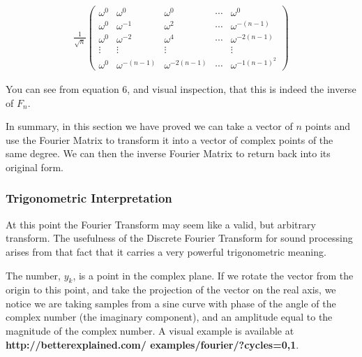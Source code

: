 \documentclass[DIV=calc, paper=a4, fontsize=11pt, twocolumn]{scrartcl}   %
\begin{document}
\begin{align}
\frac{1}{\sqrt n}
 \begin{pmatrix}
  \omega^0 & \omega^0 & \omega^0 & \cdots & \omega^0 \\
  \omega^0  & \omega^{-1} & \omega^2 &  \cdots &  \omega^{-(n-1)} \\
   \omega^0  & \omega^{-2} & \omega^4 &  \cdots &  \omega^{-2(n-1)} \\
  \vdots  & \vdots  & \vdots &   & \vdots  \\
  \omega^0  & \omega^{-(n-1)} & \omega^{-2(n-1)} & \cdots & \omega^{{-1(n-1)}^2}
 \end{pmatrix}
\end{align}

You can see from equation 6, and visual inspection, that this is indeed the inverse of $F_{n}$.
\par In summary, in this section we have proved we can take a vector of $n$ points and use the Fourier Matrix to transform it into a vector of complex points of the same degree. We can then the inverse Fourier Matrix to return back into its original form.
\subsubsection{Trigonometric Interpretation}

At this point the Fourier Transform may seem like a valid, but arbitrary transform. The usefulness of the Discrete Fourier Transform for sound processing arises from that fact that it carries a very powerful trigonometric meaning.

\par The number, $y_k$, is a point in the complex plane. If we rotate the vector from the origin to this point, and take the projection of the vector on the real axis, we notice we are taking samples from a sine curve with phase of the angle of the complex number (the imaginary component), and an amplitude equal to the magnitude of the complex number. A visual example is available at \textbf{http://betterexplained.com/ examples/fourier/?cycles=0,1}.
\end{document}

